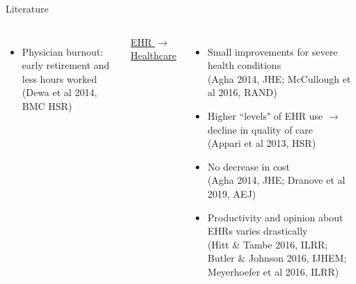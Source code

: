 \documentclass[10pt]{beamer}
\begin{document}
\begin{frame}[noframenumbering]{Literature}
\begin{columns}
\begin{itemize}
            \footnotesize
            
            \item Physician burnout: early retirement and less hours worked \\ \vspace{1mm} 
            \tiny (Dewa et al 2014, BMC HSR)
        \end{itemize}
        
        \centering
        \color{gray}
        \underline{ EHR $\rightarrow$ Healthcare }
        \vspace{-1mm}
        \begin{itemize}
        \color{gray}
            \item Small improvements for severe health conditions \\ \vspace{1mm}
            \tiny(Agha 2014, JHE; McCullough et al 2016, RAND)
            
            \footnotesize
            
            \item Higher ``levels" of EHR use $\rightarrow$ decline in quality of care\\ \vspace{1mm}
            \tiny (Appari et al 2013, HSR)
            
            \footnotesize 
            
            \item No decrease in cost \\ \vspace{1mm}
            \tiny (Agha 2014, JHE; Dranove et al 2019, AEJ) 
            
            \footnotesize
            
            \item Productivity and opinion about EHRs varies drastically \\ \vspace{1mm}
            \tiny (Hitt $\&$ Tambe 2016, ILRR; Butler $\&$ Johnson 2016, IJHEM; Meyerhoefer et al 2016, ILRR)
            
        \end{itemize}
        
\end{columns}
\end{frame}
\end{document}
